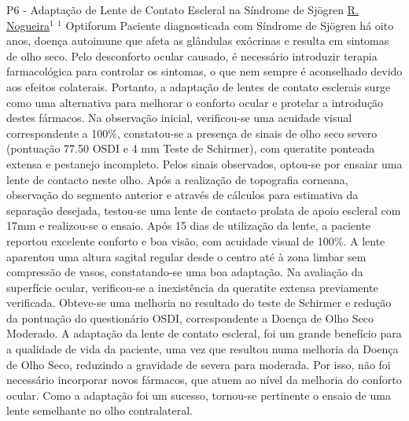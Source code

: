 
    \begin{abstract_online}{P6 - Adaptação de Lente de Contato Escleral na Síndrome de Sjögren }{%
        \underline{R. Nogueira}$^{1}$}{%
        }{%
        $^1$ Optiforum\newline{}}
        Paciente diagnosticada com Síndrome de Sjögren há oito anos, doença autoimune que afeta as glândulas exócrinas e resulta em sintomas de olho seco. Pelo desconforto ocular causado, é necessário introduzir terapia farmacológica para controlar os sintomas, o que nem sempre é aconselhado devido aos efeitos colaterais. Portanto, a adaptação de lentes de contato esclerais surge como uma alternativa para melhorar o conforto ocular e protelar a introdução destes fármacos.
        Na observação inicial, verificou-se uma acuidade visual correspondente a 100\%, constatou-se a presença de sinais de olho seco severo (pontuação 77.50 OSDI e 4 mm Teste de Schirmer), com queratite ponteada extensa e pestanejo incompleto. Pelos sinais observados, optou-se por ensaiar uma lente de contacto neste olho.
        Após a realização de topografia corneana, observação do segmento anterior e através de cálculos para estimativa da separação desejada, testou-se uma lente de contacto prolata de apoio escleral com 17mm e realizou-se o ensaio.
        Após 15 dias de utilização da lente, a paciente reportou excelente conforto e boa visão, com acuidade visual de 100\%. A lente aparentou uma altura sagital regular desde o centro até à zona limbar sem compressão de vasos, constatando-se uma boa adaptação. Na avaliação da superfície ocular, verificou-se a inexistência da queratite extensa previamente verificada. Obteve-se uma melhoria no resultado do teste de Schirmer e redução da pontuação do questionário OSDI, correspondente a Doença de Olho Seco Moderado.
        A adaptação da lente de contato escleral, foi um grande benefício para a qualidade de vida da paciente, uma vez que resultou numa melhoria da Doença de Olho Seco, reduzindo a gravidade de severa para moderada. Por isso, não foi necessário incorporar novos fármacos, que atuem ao nível da melhoria do conforto ocular. Como a adaptação foi um sucesso, tornou-se pertinente o ensaio de uma lente semelhante no olho contralateral.
    \end{abstract_online}
    